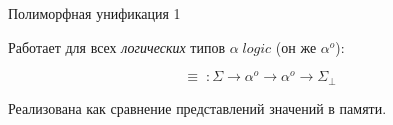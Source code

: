 \documentclass[10pt, mathserif]{beamer}
\newcommand{\oo}[1]{{#1}^o}
\theoremstyle{definition}
\begin{document}
\begin{frame}[fragile]{Полиморфная унификация 1}

Работает для всех \emph{логических} типов $\alpha\; logic$ (он же $\oo{\alpha}$):

$$
\equiv\;\colon \Sigma\to\oo{\alpha}\to\oo{\alpha}\to\Sigma_{\perp}
$$
\pause

Реализована как сравнение представлений значений в памяти.

%

\vskip3mm
%
\end{frame}
\end{document}
